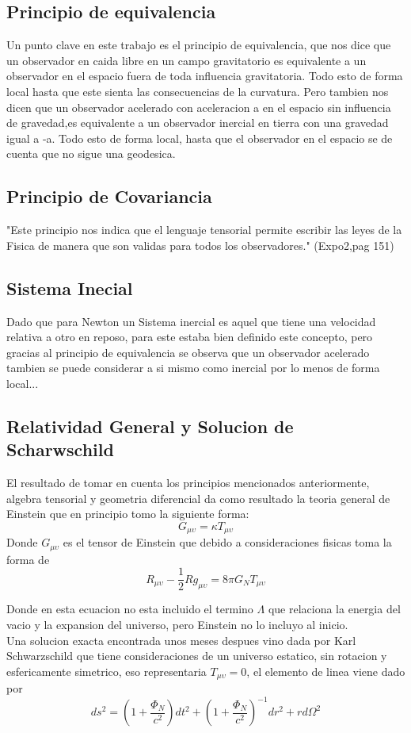 \documentclass[12pt,twoside]{rif}
\begin{document}
	\subsection{Principio de equivalencia}
	Un punto clave en este trabajo es el principio de equivalencia, que nos dice que un observador en caida libre en un campo gravitatorio es equivalente a un observador en el espacio fuera de toda influencia gravitatoria. Todo esto de forma local hasta que este sienta las consecuencias de la curvatura. Pero tambien nos dicen que un observador acelerado con aceleracion a en el espacio sin influencia de gravedad,es equivalente a un observador inercial en tierra con una gravedad igual a -a. Todo esto de forma local, hasta que el observador en el espacio se de cuenta que no sigue una geodesica.
	\subsection{Principio de Covariancia}
	"Este principio nos indica que el lenguaje tensorial permite escribir las leyes de la Fisica de manera que son validas para todos los observadores." (Expo2,pag 151)
	\subsection{Sistema Inecial}
	Dado que para Newton un Sistema inercial es aquel que tiene una velocidad relativa a otro en reposo, para este estaba bien definido este concepto, pero gracias al principio de equivalencia se observa que un observador acelerado tambien se puede considerar a si mismo como inercial por lo menos de forma local...
	\subsection{Relatividad General y Solucion de Scharwschild}
	El resultado de tomar en cuenta los principios mencionados anteriormente, algebra tensorial y geometria diferencial da como resultado la teoria general de Einstein que en principio tomo la siguiente forma:
	\begin{equation}
	G_{\mu\upsilon}=\kappa T_{\mu\upsilon}
	\end{equation}
Donde $G_{\mu\upsilon}$ es el tensor de Einstein que debido a consideraciones fisicas toma la forma de 
\begin{equation}
R_{\mu\upsilon}-\frac{1}{2}Rg_{\mu\upsilon}=8\pi G_{N}T_{\mu\upsilon}
\end{equation}	

Donde en esta ecuacion no esta incluido el termino $\Lambda$ que relaciona la energia del vacio y la expansion del universo, pero Einstein no lo incluyo al inicio.\\
Una solucion exacta encontrada unos meses despues vino dada por Karl Schwarzschild que tiene consideraciones de un universo estatico, sin rotacion y esfericamente simetrico, eso representaria $T_{\mu\upsilon}=0$, el elemento de linea viene dado por
\begin{equation}
ds^{2}=\left(1+\frac{\Phi_{N}}{c^{2}}\right)dt^{2}+\left(1+\frac{\Phi_{N}}{c^{2}}\right)^{-1}dr^{2}+rd\Omega^{2} 
\end{equation}
\end{document}
